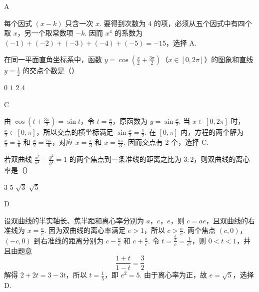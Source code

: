 \begin{answer}
A
\end{answer}

\begin{solution}
每个因式 \((x-k)\) 只含一次 \(x\). 要得到次数为 \(4\) 的项，必须从五个因式中有四个取 \(x\)，另一个取常数项 \(-k\). 因而 \(x^4\) 的系数为 \((-1)+(-2)+(-3)+(-4)+(-5)=-15\)，选择 A.
\end{solution}

\begin{problem}
在同一平面直角坐标系中，函数 \( y = \cos \left( \frac{x}{2} + \frac{3\pi}{2} \right) \)（\(x \in [0, 2\pi]\)）的图象和直线 \( y = \frac{1}{2} \) 的交点个数是（\quad）

\choices
    {\(0\)}
    {\(1\)}
    {\(2\)}
    {\(4\)}
\end{problem}

\begin{answer}
C
\end{answer}

\begin{solution}
由 \(\cos\left(t+\frac{3\pi}{2}\right)=\sin t\)，令 \(t=\frac{x}{2}\)，原函数为 \(y=\sin\frac{x}{2}\). 当 \(x\in[0,2\pi]\) 时，\(\frac{x}{2}\in[0,\pi]\)，所以交点的横坐标满足 \(\sin\frac{x}{2}=\frac12\). 在 \([0,\pi]\) 内，方程的两个解为 \(\frac{x}{2}=\frac\pi6\) 和 \(\frac{x}{2}=\frac{5\pi}{6}\)，对应 \(x=\frac\pi3\) 和 \(x=\frac{5\pi}{3}\). 因而交点有 \(2\) 个，选择 C.
\end{solution}

\begin{problem}
若双曲线 \(\frac{x^2}{a^2} - \frac{y^2}{b^2} = 1\) 的两个焦点到一条准线的距离之比为 \(3:2\)，则双曲线的离心率是（\quad）

\choices
    {\(3\)}
    {\(5\)}
    {\(\sqrt{3}\)}
    {\(\sqrt{5}\)}
\end{problem}

\begin{answer}
D
\end{answer}

\begin{solution}
设双曲线的半实轴长、焦半距和离心率分别为 \(a\)，\(c\)，\(e\)，则 \(c=ae\)，且双曲线的右准线为 \(x=\frac{a}{e}\). 因为双曲线的离心率满足 \(e>1\)，所以 \(c>\frac{a}{e}\). 两个焦点 \((c,0)\)，\((-c,0)\) 到右准线的距离分别为 \(c-\frac{a}{e}\) 和 \(c+\frac{a}{e}\). 令 \(t=\frac{\frac{a}{e}}{c}=\frac1{e^2}\)，则 \(0<t<1\)，并且由题意
\[\frac{1+t}{1-t}=\frac32\]
解得 \(2+2t=3-3t\)，所以 \(t=\frac15\)，即 \(e^2=5\). 由于离心率为正，故 \(e=\sqrt5\)，选择 D.
\end{solution}

